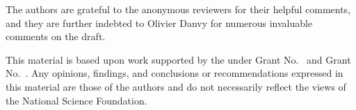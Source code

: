 \documentclass[acmsmall, review]{acmart}\settopmatter{}
\begin{document}
\begin{acks}                            %
  The authors are grateful to the anonymous reviewers for their 
  helpful comments, and they are further indebted to Olivier Danvy 
  for numerous invaluable comments on the draft.

  This material is based upon work supported by the
   under Grant
  No.~ and Grant
  No.~.  Any opinions, findings, and
  conclusions or recommendations expressed in this material are those
  of the authors and do not necessarily reflect the views of the
  National Science Foundation. 
\end{acks}




\end{document}
